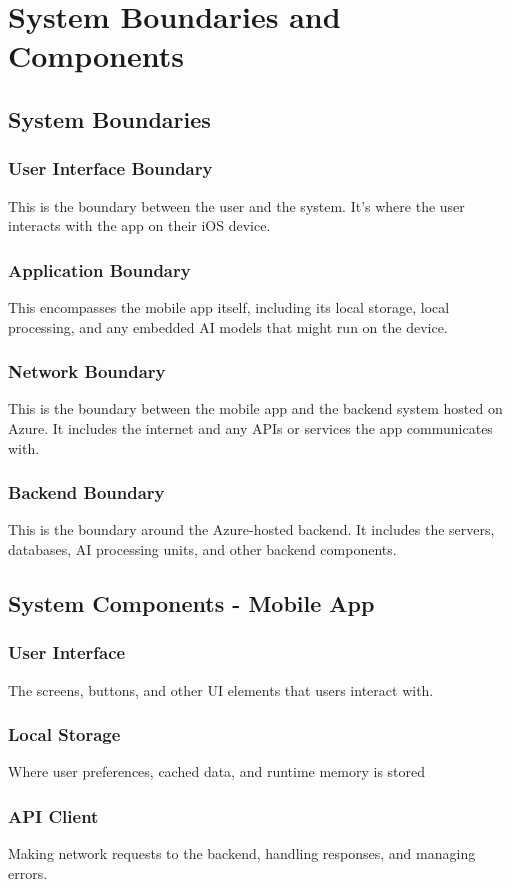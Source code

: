 \documentclass{article}
\begin{document}
\section{System Boundaries and Components}

\subsection{System Boundaries}
\subsubsection{User Interface Boundary} This is the boundary between the user and the system. It's where the user interacts with the app on their iOS device.
\subsubsection{Application Boundary} This encompasses the mobile app itself, including its local storage, local processing, and any embedded AI models that might run on the device.
\subsubsection{Network Boundary} This is the boundary between the mobile app and the backend system hosted on Azure. It includes the internet and any APIs or services the app communicates with.
\subsubsection{Backend Boundary} This is the boundary around the Azure-hosted backend. It includes the servers, databases, AI processing units, and other backend components.


\subsection{System Components - Mobile App}
\subsubsection{User Interface} The screens, buttons, and other UI elements that users interact with.
\subsubsection{Local Storage} Where user preferences, cached data, and runtime memory is stored
\subsubsection{API Client} Making network requests to the backend, handling responses, and managing errors.
\end{document}
